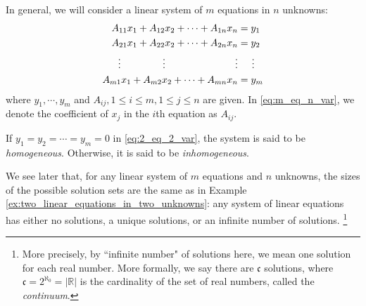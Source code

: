 \documentclass[12pt,letterpaper,reqno]{article}
\numberwithin{equation}{section}
\newcommand{\ti}[1]{\textit{#1}}
\begin{document}
In general, we will consider a linear system of $m$ equations in $n$ unknowns:
\begin{equation}\label{eq:m_eq_n_var}
\begin{split}
	A_{11}x_1+A_{12}x_2+\cdots + A_{1n}x_n &=y_1 \\
	A_{21}x_1+A_{22}x_2+\cdots + A_{2n}x_n &=y_2 \\
	\vdots \hspace{1.5cm} \vdots \hspace{2.5cm} \vdots & \hspace{0.5cm}\vdots  \\
	A_{m1}x_1+A_{m2}x_2+\cdots + A_{mn}x_n &=y_m \\
\end{split}	
\end{equation}
where $y_1,\cdots, y_m$ and $A_{ij}, 1 \leq i \leq m, 1 \leq j \leq n$ are given. In \eqref{eq:m_eq_n_var}, we denote the coefficient of $x_j$ in the $i$th equation as $A_{ij}$.


\begin{defn}\label{def:homogeneous_and_inhomogeneous_sytems}
If $y_1=y_2=\cdots=y_m=0$ in 
\eqref{eq:2_eq_2_var}, the system is said to be \ti{homogeneous}. Otherwise, it is said to be \ti{inhomogeneous}.
\end{defn}
We see later that, for any linear system of $m$ equations and $n$ unknowns, the sizes of the possible solution sets are the same as in Example \ref{ex:two_linear_equations_in_two_unknowns}: any system of linear equations has either no solutions, a unique solutions, or an infinite number of solutions. \footnote{More precisely, by ``infinite number" of solutions here, we mean one solution for each real number. More formally, we say there are $\mathfrak{c}$ solutions, where $\mathfrak{c}=2^{\aleph_0}=|\mathbb{R}|$ is the cardinality of the set of real numbers, called the \ti{continuum}.}
\end{document}
